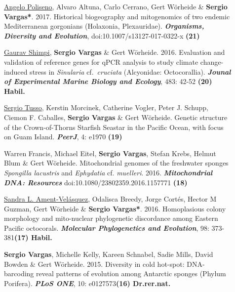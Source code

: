 \documentclass[letter,10pt]{article}
\begin{document}
\begin{description}
\item[]\underline{\underline{Angelo Poliseno}}, Alvaro Altuna, Carlo Cerrano, Gert W\"orheide \& \textbf{Sergio Vargas*}. 2017. Historical biogeography and mitogenomics of two endemic Mediterranean gorgonians (Holaxonia, Plexauridae). \textbf{\emph{Organisms, Diversity and Evolution}}, doi:10.1007/s13127-017-0322-x \hfill\textbf{{\scriptsize (21)}}

\item[]\underline{\underline{Gaurav Shimpi}}, \textbf{Sergio Vargas} \& Gert W\"orheide. 2016. Evaluation and validation of reference genes for qPCR analysis to study climate change-induced stress in \emph{Sinularia} cf.~\emph{cruciata} (Alcyonidae: Octocorallia). \textbf{\emph{Jounal of Experimental Marine Biology and Ecology}}, 483: 42-52 \hfill\textbf{{\scriptsize (20) Habil.}}

\item[]\underline{Sergio Tusso}, Kerstin Morcinek, Catherine Vogler, Peter J. Schupp,  Ciemon F. Caballes, \textbf{Sergio Vargas} \& Gert W\"orheide. Genetic structure of the Crown-of-Thorns Starfish Seastar in the Pacific Ocean, with focus on Guam Island. \textbf{\emph{PeerJ}}, 4: e1970 \hfill\textbf{{\scriptsize (19)}}

\item[]Warren Francis, Michael Eitel, \textbf{Sergio Vargas}, Stefan Krebs, Helmut Blum \& Gert W\"orheide. Mitochondrial genomes of the freshwater sponges \emph{Spongilla lacustris} and \emph{Ephydatia} cf. \emph{muelleri}. 2016. \textbf{\emph{Mitochondrial DNA: Resources}} doi:10.1080/23802359.2016.1157771 \hfill\textbf{{\scriptsize (18)}}

\item[]\underline{Sandra L. Ament-Vel\'asquez}, Odalisca Breedy, Jorge Cort\'es, Hector M Guzman, Gert W\"orheide \& \textbf{Sergio Vargas*}. 2016. Homoplasious colony morphology and mito-nuclear phylogenetic discordance among Eastern Pacific octocorals. \textbf{\emph{Molecular Phylogenetics and Evolution}}, 98: 373-381\hfill\textbf{{\scriptsize (17) Habil.}}

\item[]\textbf{Sergio Vargas}, Michelle Kelly, Kareen Schnabel, Sadie Mills, David Bowden \& Gert W\"orheide. 2015. Diversity in cold hot-spot: DNA-barcoding reveal patterns of evolution among Antarctic sponges (Phylum Porifera). \textbf{\emph{PLoS ONE}}, 10: e0127573\hfill\textbf{{\scriptsize (16) Dr.rer.nat.}}


\end{description}
\end{document}
